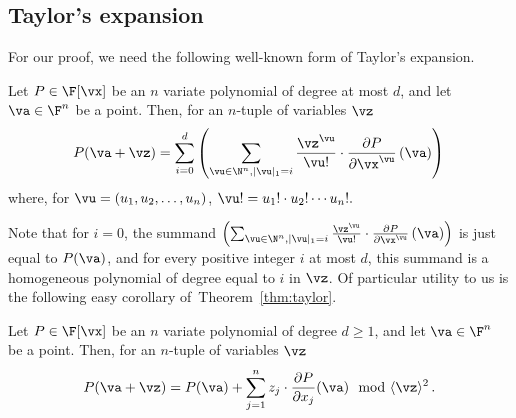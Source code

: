 \subsection{Taylor's expansion}
\label{sec:prelim-taylor}
For our proof, we need the following well-known form of Taylor's expansion. 
\begin{theorem}\label{thm:taylor}
Let $P \in \F[\vx]$ be an $n$ variate polynomial of degree at most $d$, and  let $\va \in \F^n$ be a point. Then, for an $n$-tuple of variables $\vz$
\[
P(\va + \vz) = \sum_{i = 0}^d \left(\sum_{\vu \in \N^{n}, |\vu|_1 = i} \frac{\vz^{\vu}}{\vu !} \cdot \frac{\partial P}{\partial \vx^{\vu}}\left(\va\right) \right) \, 
\]  
where, for $\vu = (u_1, u_2, \ldots, u_n)$, $\vu! = u_1!\cdot u_2!\cdots u_n!.$
\end{theorem} 
Note that for $i = 0$, the summand $\left(\sum_{\vu \in \N^{n}, |\vu|_1 = i} \frac{\vz^{\vu}}{\vu !} \cdot \frac{\partial P}{\partial \vx^{\vu}}\left(\va\right) \right)$ is just equal to $P(\va)$, and for every positive integer $i$ at most $d$, this summand is a homogeneous polynomial of degree equal to $i$ in $\vz$. Of particular utility to us is the following easy corollary of~Theorem~\ref{thm:taylor}. 
\begin{corollary}\label{cor:taylor truncation}
Let $P \in \F[\vx]$ be an $n$ variate polynomial of degree $d \geq 1$, and  let $\va \in \F^n$ be a point. Then, for an $n$-tuple of variables $\vz$
\[
P(\va + \vz) = P(\va) + \sum_{j = 1}^n z_j \cdot \frac{\partial P}{\partial x_j}(\va) \mod \langle \vz \rangle^2\, .
\]  

\end{corollary}

